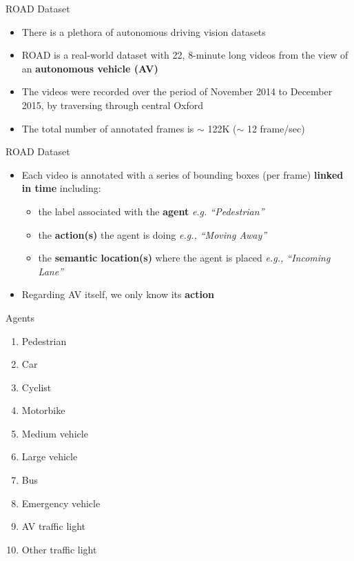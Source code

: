 \documentclass[10pt, aspectratio=169]{beamer}
\begin{document}
\begin{frame}{ROAD Dataset}
    \begin{itemize}
        \setlength{\itemsep}{13pt}
        \item There is a plethora of autonomous driving vision datasets
        \item ROAD is a real-world dataset with \textcolor{umBlueLighter}{22}, \textcolor{umBlueLighter}{8-minute} long videos from the view of an \textbf{autonomous vehicle (AV)}
        \item The videos were recorded over the period of November 2014 to December 2015, by traversing through central Oxford
        \item The total number of annotated frames is $\sim$ 122K ($\sim$ 12 frame/sec)
    \end{itemize}
\end{frame}


\begin{frame}{ROAD Dataset}
    \begin{itemize}
        \setlength{\itemsep}{15pt}
        \item Each video is annotated with a \textcolor{umBlueLighter}{series of bounding boxes} (per frame) \textbf{linked in time} including:
        \vspace{4pt}
        \begin{itemize}
            \setlength{\itemsep}{4pt}
            \item the label associated with the \textbf{agent} \textit{e.g. “Pedestrian”}
            \item the \textbf{action(s)} the agent is doing \textit{e.g., “Moving Away”}
            \item the \textbf{semantic location(s)} where the agent is placed \textit{e.g., “Incoming Lane”}
        \end{itemize}
        \item Regarding AV itself, we only know its \textbf{action}
    \end{itemize}
\end{frame}


\begin{frame}{Agents}
  \begin{multicols}{2}
        \begin{enumerate}
            \setlength\itemsep{1em}
            \item Pedestrian
            \item Car
            \item Cyclist
            \item Motorbike
            \item Medium vehicle
            \item Large vehicle
            \item Bus
            \item Emergency vehicle
            \item AV traffic light
            \item Other traffic light
        \end{enumerate}
    \end{multicols}
\end{frame}
\end{document}
